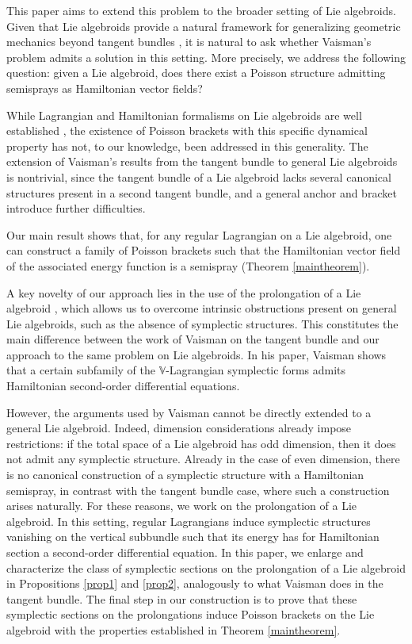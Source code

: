 \documentclass[12pt,letterpaper]{article}
\numberwithin{equation}{section}
\begin{document}
This paper aims to extend this problem to the broader setting of Lie algebroids. Given that Lie algebroids provide a natural framework for generalizing geometric mechanics beyond tangent bundles \cite{BarberoEtAl2016,CortesEtAl2009,CortesEtAl2006,dediego-marrero-2006,deLeonEtAl2009,deLeonEtAl2005,Grabowska-2006,IglesiasEtAl2007,Martinez2001,Weinstein1996}, it is natural to ask whether Vaisman’s problem admits a solution in this setting. More precisely, we address the following question: given a Lie algebroid, does there exist a Poisson structure admitting semisprays as Hamiltonian vector fields?


While Lagrangian and Hamiltonian formalisms on Lie algebroids are well established \cite{dediego-marrero-2006,deLeonEtAl2005,Martinez2001}, the existence of Poisson brackets with this specific dynamical property has not, to our knowledge, been addressed in this generality. The extension of Vaisman's results from the tangent bundle to general Lie algebroids is nontrivial,
since the tangent bundle of a Lie algebroid lacks several canonical structures present in a second tangent bundle,
and a general anchor and bracket introduce further difficulties.

Our main result shows that, for any regular Lagrangian on a Lie algebroid, one can construct a family of Poisson brackets such that the Hamiltonian vector field of the associated energy function is a semispray (Theorem \ref{maintheorem}). 

A key novelty of our approach lies in the use of the prolongation of a Lie algebroid \cite{carinena2007reduction,deLeonEtAl2005,martinez2002lie,Martinez2001}, 
which allows us to overcome intrinsic obstructions present on general Lie algebroids, such as the absence of symplectic structures.
This constitutes the main difference between the work of Vaisman on the tangent bundle and our approach to the same problem on Lie algebroids.
In his paper, Vaisman shows that a certain subfamily of the $\mathbb{V}$-Lagrangian symplectic forms admits Hamiltonian second-order differential equations. 

However, the arguments used by Vaisman cannot be directly extended to a general Lie algebroid. 
Indeed, dimension considerations already impose restrictions: if the total space of a Lie algebroid has odd dimension, then it does not admit any symplectic structure. Already in the case of even dimension, 
there is no canonical construction of a symplectic structure with a Hamiltonian semispray, in contrast with the tangent bundle case, where such a construction arises naturally.
For these reasons, we work on the prolongation of a Lie algebroid. In this setting, regular Lagrangians induce symplectic structures vanishing on the vertical subbundle such that its energy has for Hamiltonian section a second-order differential equation. In this paper, we enlarge and characterize the class of symplectic sections on the prolongation of a Lie algebroid in Propositions \ref{prop1} and \ref{prop2}, analogously to what Vaisman does in the tangent bundle. The final step in our construction is to prove that these symplectic sections on the prolongations induce Poisson brackets on the Lie algebroid with the properties established in Theorem \ref{maintheorem}.
\end{document}
